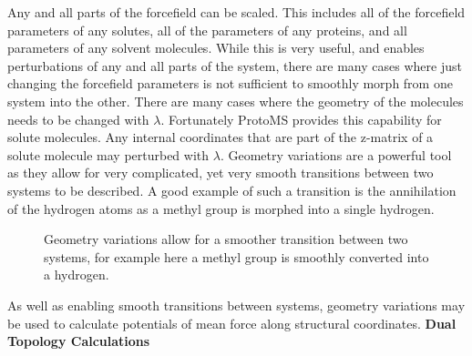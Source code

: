 \documentclass[letterpaper,10pt,english]{manual}
\begin{document}
Any and all parts of the forcefield can be scaled. This includes all of the forcefield parameters of any solutes, all of the parameters of any proteins, and all parameters of any solvent molecules. While this is very useful, and enables perturbations of any and all parts of the system, there are many cases where just changing the forcefield parameters is not sufficient to smoothly morph from one system into the other. There are many cases where the geometry of the molecules needs to be changed with $\lambda$. Fortunately ProtoMS provides this capability for solute molecules. Any internal coordinates that are part of the z-matrix of a solute molecule may perturbed with $\lambda$. Geometry variations are a powerful tool as they allow for very complicated, yet very smooth transitions between two systems to be described. A good example of such a transition is the annihilation of the hydrogen atoms as a methyl group is morphed into a single hydrogen.
\begin{figure}[htbp]
\centering

\caption{Geometry variations allow for a smoother transition between two systems, for example here a methyl group is smoothly converted into a hydrogen.}\end{figure}

As well as enabling smooth transitions between systems, geometry variations may be used to calculate potentials of mean force along structural coordinates.
\textbf{Dual Topology Calculations}
\end{document}
